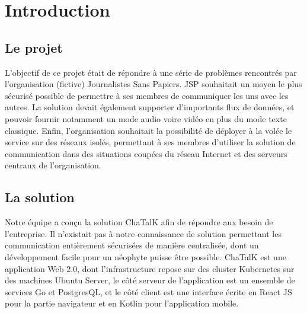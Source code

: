 \section{Introduction}


\subsection{Le projet}

L'objectif de ce projet était de répondre à une série de problèmes rencontrés par l'organisation (fictive) Journalistes Sans Papiers.
JSP souhaitait un moyen le plus sécurisé possible de permettre à ses membres de communiquer les uns avec les autres.
La solution devait également supporter d'importants flux de données, et pouvoir fournir notamment un mode audio voire vidéo en plus du mode texte classique.
Enfin, l'organisation souhaitait la possibilité de déployer à la volée le service sur des réseaux isolés, permettant à ses membres d'utiliser la solution de communication dans des situations coupées du réseau Internet et des serveurs centraux de l'organisation.

\subsection{La solution}

Notre équipe a conçu la solution ChaTalK afin de répondre aux besoin de l'entreprise.
Il n'existait pas à notre connaissance de solution permettant les communication entièrement sécurisées de manière centralisée, dont un développement facile pour un néophyte puisse être possible.
ChaTalK est une application Web 2.0, dont l'infrastructure repose sur des cluster Kubernetes sur des machines Ubuntu Server, le côté serveur de l'application est un ensemble de services Go et PostgresQL, et le côté client est une interface écrite en React JS pour la partie navigateur et en Kotlin pour l'application mobile.
